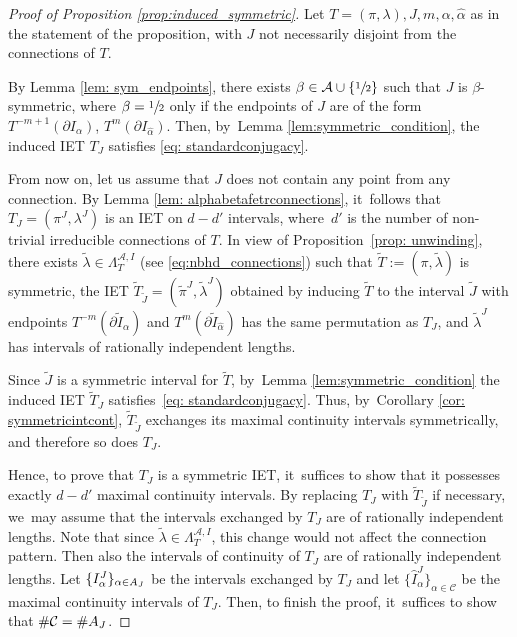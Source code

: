 \documentclass[JEP,XML,SOM,Unicode,NoEqCountersInSection,NoFloatCountersInSection,published]{cedram}
\theoremstyle{plain}
\theoremstyle{definition}
\newcommand{\A}{\mathcal{A}}
\begin{document}
\begin{proof}[Proof of Proposition \ref{prop:induced_symmetric}]
Let $T = (\pi, \lambda), J, m, \alpha, \hat \alpha$ as in the statement of the proposition, with $J$ not necessarily disjoint from the connections of $T$.

By Lemma \ref{lem: sym_endpoints}, there exists $\beta \in \A \cup \{\sfrac{1}{2}\}$ such that $J$ is $\beta$-symmetric, where $\beta = \sfrac{1}{2}$ only if the endpoints of $J$ are of the form $T^{-m + 1}(\partial I_\alpha)$, $T^m(\partial I_{\hat \alpha})$. Then, by~Lemma \ref{lem:symmetric_condition}, the induced IET $T_J$ satisfies \eqref{eq: standardconjugacy}.

From now on, let us assume that $J$ does not contain any point from any connection.
By Lemma \ref{lem: alphabetafetrconnections}, it~follows that $T_J = (\pi^J, \lambda^J)$ is an IET on $d - d'$ intervals, where~$d'$ is the number of non-trivial irreducible connections of $T$. In view of Proposition~\ref{prop: unwinding}, there exists $\tilde\lambda\in\Lambda^{\mathcal A,I}_T$ (see \eqref{eq:nbhd_connections}) such that $\tilde{T}:=(\pi,\tilde\lambda)$ is symmetric, the IET $\tilde{T}_{\tilde J} = (\tilde \pi^J, \tilde \lambda^J)$ obtained by inducing $\tilde{T}$ to the interval $\tilde J$ with endpoints $T^{-m}(\partial \tilde I_{\alpha})$ and $T^{m}(\partial \tilde I_{\hat\alpha})$ has the same permutation as $T_J$, and $\tilde\lambda^J$ has intervals of rationally independent lengths.

Since $\tilde J$ is a symmetric interval for $\tilde T$, by~Lemma \ref{lem:symmetric_condition} the induced IET $\tilde T_J$ satisfies~\eqref{eq: standardconjugacy}. Thus, by~Corollary \ref{cor: symmetricintcont}, $\tilde{T}_{\tilde J}$ exchanges its maximal continuity intervals symmetrically, and therefore so does $T_J$.

Hence, to prove that $T_J$ is a symmetric IET, it~suffices to show that it possesses exactly $d - d'$ maximal continuity intervals. By replacing $T_J$ with $\tilde{T}_{\tilde J}$ if necessary, we~may assume that the intervals exchanged by $T_{J}$ are of rationally independent lengths. Note that since $\tilde\lambda\in\Lambda^{\mathcal A,I}_T$, this change would not affect the connection pattern. Then also the intervals of continuity of $T_J$ are of rationally independent lengths. Let $\{I^J_{\alpha}\}_{\alpha\in\mathcal \A_J}$ be the intervals exchanged by $T_J$ and let $\{\hat I^J_{\alpha}\}_{\alpha\in\mathcal C}$ be the maximal continuity intervals of $T_J$. Then, to finish the proof, it~suffices to show that $\#\mathcal C = \#\mathcal \A_J$.


\end{proof}
\end{document}
